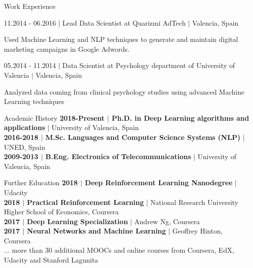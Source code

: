 \documentclass{resume} %
\begin{document}
\begin{rSection}{Work Experience}
\vspace{-6pt}

\begin{rSubsection}{11.2014 - 06.2016 $|$ Lead Data Scientist at Quarizmi AdTech  $|$  \textnormal{Valencia, Spain}}{}{}

    \vspace{-3pt}

    \item Used Machine Learning and NLP techniques to generate and maintain digital marketing campaigns in Google Adwords.
\end{rSubsection}

\vspace{-6pt}

\begin{rSubsection}{05.2014 - 11.2014 $|$ Data Scientist at Psychology department of University of Valencia  $|$  \textnormal{Valencia, Spain}}{}{}

    \vspace{-3pt}

    \item Analyzed data coming from clinical psychology studies using advanced Machine Learning techniques

\end{rSubsection}


\end{rSection}


\begin{rSection}{Academic History}
{\textbf{2018-Present $|$ Ph.D. in Deep Learning algorithms and applications}  $|$  University of Valencia, Spain}
\\
{\textbf{2016-2018 $|$ M.Sc. Languages and Computer Science Systems (NLP)}  $|$  UNED, Spain}
\\
{\textbf{2009-2013 $|$ B.Eng. Electronics of Telecommunications}  $|$ University of Valencia, Spain}
\end{rSection}

\begin{rSection}{Further Education}
{\textbf{2018 $|$ Deep Reinforcement Learning Nanodegree}  $|$  Udacity}\\
{\textbf{2018 $|$ Practical Reinforcement Learning}  $|$  National Research University Higher School of Economics, Coursera} \\
{\textbf{2017 $|$ Deep Learning Specialization}  $|$  Andrew Ng, Coursera}\\
{\textbf{2017 $|$ Neural Networks and Machine Learning}  $|$  Geoffrey Hinton, Coursera}\\
{... more than 30 additional MOOCs and online courses from Coursera, EdX, Udacity and Stanford Lagunita}
\end{rSection}
\end{document}
